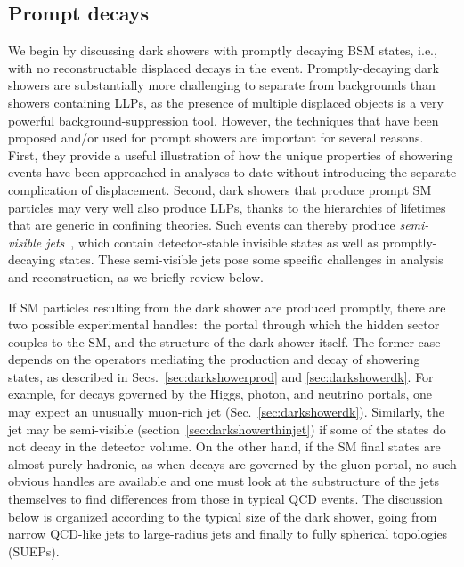 \subsection{Prompt decays}
\label{sec:darkshowerprompt}

We begin by discussing dark showers with promptly decaying BSM states, i.e., with no reconstructable displaced decays in the event. Promptly-decaying dark showers are substantially more challenging to separate from backgrounds than showers containing LLPs, as the presence of multiple displaced objects is a very powerful background-suppression tool. However, the techniques that have been proposed and/or used for prompt showers are important for several reasons. First, they provide a useful illustration of how the unique properties of showering events have been approached in analyses to date without introducing the separate complication of displacement. Second, dark showers that produce prompt SM particles may very well also produce LLPs, thanks to the hierarchies of lifetimes that are generic in confining theories.  Such events can thereby produce {\em semi-visible jets}~\cite{Cohen:2015toa}, which contain detector-stable invisible states as well as promptly-decaying states. These semi-visible jets pose some specific challenges in analysis and reconstruction, as we briefly review below.

If SM particles resulting from the dark shower are produced promptly, there are two possible experimental handles:~the portal through which the hidden sector couples to the SM, and the structure of the dark shower itself.
The former case  depends on the operators mediating the production and decay of showering states, as described in Secs.~\ref{sec:darkshowerprod} and \ref{sec:darkshowerdk}.
For example, for decays governed by the Higgs, photon, and neutrino portals, one may expect an unusually muon-rich jet (Sec.~\ref{sec:darkshowerdk}). Similarly, the jet may be semi-visible (section~\ref{sec:darkshowerthinjet}) if some of the states do not decay in the detector volume. On the other hand, if the SM final states are almost purely hadronic, as when decays are governed by the gluon portal, no such obvious handles are available and one must look at the substructure of the jets themselves to find differences from those in typical QCD events. The discussion below is organized according to the typical size of the dark shower, going from narrow QCD-like jets to large-radius jets and finally to fully spherical topologies (SUEPs).

